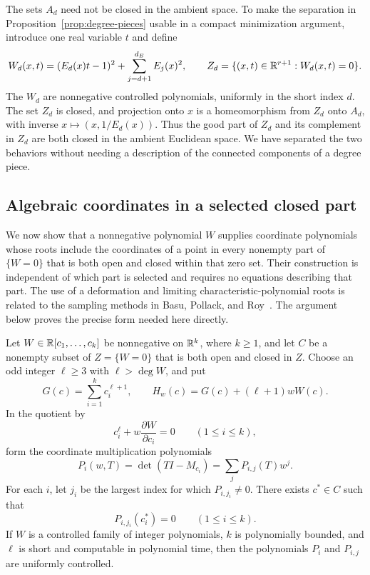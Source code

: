 The sets $A_d$ need not be closed in the ambient space.  To make the
separation in Proposition~\ref{prop:degree-pieces} usable in a compact
minimization argument, introduce one real variable $t$ and define
\begin{equation}\label{eq:closed-lift}
 W_d(x,t)=(E_d(x)t-1)^2+\sum_{j=d+1}^{d_E}E_j(x)^2,
 \qquad
 Z_d=\{(x,t)\in\mathbb R^{r+1}:W_d(x,t)=0\}.
\end{equation}
The $W_d$ are nonnegative controlled polynomials, uniformly in the short
index $d$.  The set $Z_d$ is closed, and projection onto $x$ is a
homeomorphism from $Z_d$ onto $A_d$, with inverse
$x\mapsto(x,1/E_d(x))$.  Thus the good part of $Z_d$ and its
complement in $Z_d$ are both closed in the ambient Euclidean space.
We have separated the two behaviors without needing a description of
the connected components of a degree piece.

\subsection{Algebraic coordinates in a selected closed part}

We now show that a nonnegative polynomial $W$ supplies coordinate
polynomials whose roots include the coordinates of a point in every
nonempty part of $\{W=0\}$ that is both open and closed within that
zero set.  Their construction is independent of which part is selected
and requires no equations describing that part.
The use of a deformation and limiting characteristic-polynomial roots
is related to the sampling methods in
Basu, Pollack, and Roy~\cite[Sections~12.5--12.6]{BasuPollackRoy2006}.
The argument below proves the precise form needed here directly.

\begin{proposition}
\label{prop:candidate-coordinates}
Let $W\in\mathbb R[c_1,\ldots,c_k]$ be nonnegative on $\mathbb R^k$, where $k\ge1$,
and let $C$ be a nonempty subset of $Z=\{W=0\}$ that is both open and
closed in $Z$.  Choose an odd integer $\ell\ge3$ with $\ell>\deg W$,
and put
\[
 G(c)=\sum_{i=1}^k c_i^{\ell+1},\qquad
 H_w(c)=G(c)+(\ell+1)wW(c).
\]
In the quotient by
\begin{equation}\label{eq:candidate-relations}
 c_i^\ell+w\frac{\partial W}{\partial c_i}=0
 \qquad(1\le i\le k),
\end{equation}
form the coordinate multiplication polynomials
\begin{equation}\label{eq:coordinate-polynomials}
 P_i(w,T)=\det(TI-M_{c_i})=\sum_j P_{i,j}(T)w^j.
\end{equation}
For each $i$, let $j_i$ be the largest index for which
$P_{i,j_i}\ne0$.  There exists $c^*\in C$ such that
\[
 P_{i,j_i}(c_i^*)=0\qquad(1\le i\le k).
\]
If $W$ is a controlled family of integer polynomials, $k$ is
polynomially bounded, and $\ell$ is short and computable in polynomial
time, then the polynomials $P_i$ and $P_{i,j}$ are uniformly controlled.
\end{proposition}

